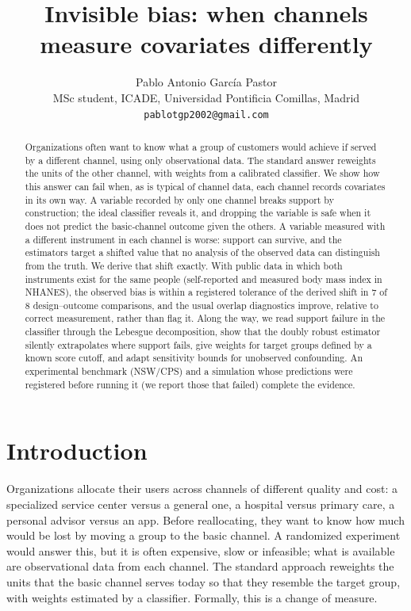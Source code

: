 \documentclass[11pt,a4paper]{article}
\title{Invisible bias: when channels measure covariates differently}
\author{Pablo Antonio García Pastor\\ \small MSc student, ICADE, Universidad Pontificia Comillas, Madrid\\ \small\texttt{pablotgp2002@gmail.com}}
\date{}
\theoremstyle{plain}
\theoremstyle{definition}
\begin{document}
\maketitle

\begin{abstract}
Organizations often want to know what a group of customers would achieve if served by a different channel, using only observational data. The standard answer reweights the units of the other channel, with weights from a calibrated classifier. We show how this answer can fail when, as is typical of channel data, each channel records covariates in its own way. A variable recorded by only one channel breaks support by construction; the ideal classifier reveals it, and dropping the variable is safe when it does not predict the basic-channel outcome given the others. A variable measured with a different instrument in each channel is worse: support can survive, and the estimators target a shifted value that no analysis of the observed data can distinguish from the truth. We derive that shift exactly. With public data in which both instruments exist for the same people (self-reported and measured body mass index in NHANES), the observed bias is within a registered tolerance of the derived shift in 7 of 8 design--outcome comparisons, and the usual overlap diagnostics improve, relative to correct measurement, rather than flag it. Along the way, we read support failure in the classifier through the Lebesgue decomposition, show that the doubly robust estimator silently extrapolates where support fails, give weights for target groups defined by a known score cutoff, and adapt sensitivity bounds for unobserved confounding. An experimental benchmark (NSW/CPS) and a simulation whose predictions were registered before running it (we report those that failed) complete the evidence.
\end{abstract}

\section{Introduction}\label{sec:intro}

Organizations allocate their users across channels of different quality and cost: a specialized service center versus a general one, a hospital versus primary care, a personal advisor versus an app. Before reallocating, they want to know how much would be lost by moving a group to the basic channel. A randomized experiment would answer this, but it is often expensive, slow or infeasible; what is available are observational data from each channel. The standard approach reweights the units that the basic channel serves today so that they resemble the target group, with weights estimated by a classifier. Formally, this is a change of measure.
\end{document}
